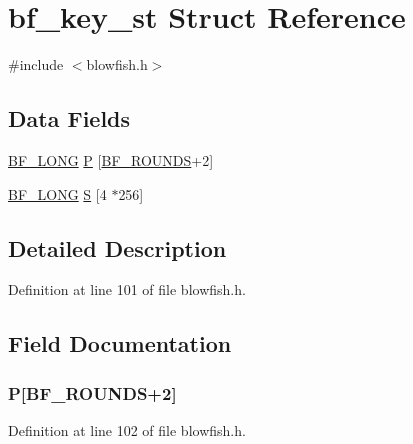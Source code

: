 \hypertarget{structbf__key__st}{}\section{bf\+\_\+key\+\_\+st Struct Reference}
\label{structbf__key__st}


{\ttfamily \#include $<$blowfish.\+h$>$}

\subsection*{Data Fields}
\begin{DoxyCompactItemize}
\item 
\hyperlink{blowfish_8h_a10d45274394a4cb51d39209f66754558}{B\+F\+\_\+\+L\+O\+NG} \hyperlink{structbf__key__st_a84bbfab4f20252d23bc7d9c642d74f91}{P} \mbox{[}\hyperlink{blowfish_8h_aaf74c725458f1e04e450aac4456b01a5}{B\+F\+\_\+\+R\+O\+U\+N\+DS}+2\mbox{]}
\item 
\hyperlink{blowfish_8h_a10d45274394a4cb51d39209f66754558}{B\+F\+\_\+\+L\+O\+NG} \hyperlink{structbf__key__st_a9731ab66322e7186b7cbffa6dc0d6d8f}{S} \mbox{[}4 $\ast$256\mbox{]}
\end{DoxyCompactItemize}


\subsection{Detailed Description}


Definition at line 101 of file blowfish.\+h.



\subsection{Field Documentation}
\subsubsection[{\texorpdfstring{P}{P}}]{ P\mbox{[}{\bf B\+F\+\_\+\+R\+O\+U\+N\+DS}+2\mbox{]}}\hypertarget{structbf__key__st_a84bbfab4f20252d23bc7d9c642d74f91}{}\label{structbf__key__st_a84bbfab4f20252d23bc7d9c642d74f91}


Definition at line 102 of file blowfish.\+h.

